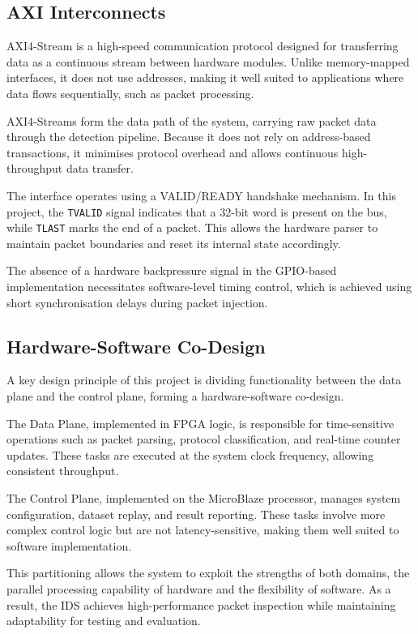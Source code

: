 \subsection{AXI Interconnects}
AXI4-Stream is a high-speed communication protocol designed for transferring
data as a continuous stream between hardware modules. Unlike memory-mapped
interfaces, it does not use addresses, making it well suited to applications
where data flows sequentially, such as packet processing.

AXI4-Streams form the data path of the system, carrying raw packet data through
the detection pipeline. Because it does not rely on address-based transactions,
it minimises protocol overhead and allows continuous high-throughput data
transfer.

The interface operates using a VALID/READY handshake mechanism. In this
project, the \texttt{TVALID} signal indicates that a 32-bit word is present on
the bus, while \texttt{TLAST} marks the end of a packet. This allows the
hardware parser to maintain packet boundaries and reset its internal state
accordingly.

The absence of a hardware backpressure signal in the GPIO-based implementation
necessitates software-level timing control, which is achieved using short
synchronisation delays during packet injection.

\subsection{Hardware-Software Co-Design}
A key design principle of this project is dividing functionality between the
data plane and the control plane, forming a hardware-software co-design.

The Data Plane, implemented in FPGA logic, is responsible for time-sensitive
operations such as packet parsing, protocol classification, and real-time
counter updates. These tasks are executed at the system clock frequency,
allowing consistent throughput.

The Control Plane, implemented on the MicroBlaze processor, manages system
configuration, dataset replay, and result reporting. These tasks involve more
complex control logic but are not latency-sensitive, making them well suited to
software implementation.

This partitioning allows the system to exploit the strengths of both domains,
the parallel processing capability of hardware and the flexibility of software.
As a result, the IDS achieves high-performance packet inspection while
maintaining adaptability for testing and evaluation.

